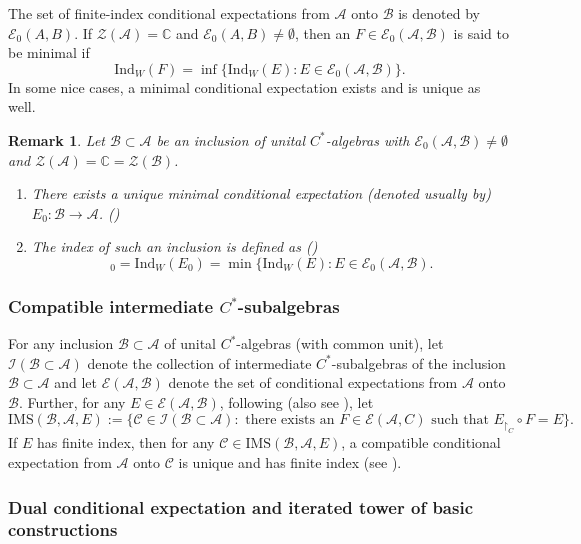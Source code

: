 \documentclass{amsart}
\numberwithin{equation}{section}
\newcommand{\Ind}{\mathrm{Ind}}
\newcommand{\mcal}{\mathcal}
\newcommand{\C}{\mathbb C}
\newcommand{\1}{\mathbf{1}}
\newcommand{\mA}{\mathcal{A}}
\newcommand{\mB}{\mathcal{B}}
\newcommand{\mC}{\mathcal{C}}
\newcommand{\mE}{\mathcal{E}}
\newcommand{\mZ}{\mathcal{Z}}
\newtheorem{remark}[theorem]{Remark}
\begin{document}
The set of finite-index conditional expectations from $\mA$ onto $\mB$
is denoted by $\mE_0(A, B)$. If $\mZ(\mA) = \C$ and $\mE_0(A, B)\neq
\emptyset$, then an $F \in \mE_0(\mA, \mB)$ is said to be minimal if
\[
\mathrm{Ind}_W(F) = \inf \{
\Ind_W(E): E \in \mE_0(\mA, \mB)\}.
\]
In some nice cases, a minimal conditional expectation
exists  and is unique as well.


\begin{remark}\label{index-defn}
Let $\mB\subset \mA$ be an inclusion of
unital $C^*$-algebras with $\mE_0(\mA, \mB) \neq \emptyset$ and 
$\mZ(\mA) = \C = \mZ(\mB)$. 
\begin{enumerate}
  \item There exists a unique minimal conditional expectation (denoted usually by) $E_0 : \mB \to \mA$. (\cite[Theorem 2.12.3]{Wat})
\item 
 The index of such an inclusion is defined as\hfill \hspace*{5mm}
 (\cite[Definition 2.12.4]{Wat})
  \begin{equation}
    [\mA : \mB]_0 = \Ind_W(E_0) = \min \{ \Ind_W(E): E \in \mE_0(\mA, \mB).
  \end{equation}
\end{enumerate}
\end{remark}


\subsubsection{Compatible intermediate $C^*$-subalgebras}

For any inclusion $\mB \subset \mA$ of unital $C^*$-algebras (with
common unit), let $\mathcal{I}(\mB \subset \mA)$ denote the collection
of intermediate $C^*$-subalgebras of the inclusion $\mB \subset \mA$
and let $\mcal{E}(\mA, \mB)$ denote the set of conditional
expectations from $\mA$ onto $\mB$. Further, for any $E \in
\mcal{E}(\mA, \mB)$, following \cite{IW} (also see \cite{BG, GS}), let
\[
\mathrm{IMS}(\mB, \mA, E):= \big\{\mC \in \mcal{I}(\mB \subset \mA):
\text{ there exists an } F\in \mcal{E}( \mA, C) \text{ such that }
E_{\restriction_C}\circ F = E\big\}.
\]
If $E$ has finite index, then for any $\mC \in \mathrm{IMS}(\mB, \mA,
E)$, a compatible conditional expectation from $\mA$ onto $\mC$ is
unique and has finite index (see \cite[Page 471]{IW}).



\subsubsection{Dual conditional expectation and iterated tower of basic constructions}
\end{document}

